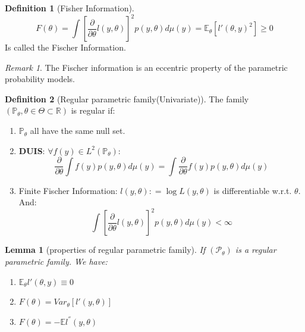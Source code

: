 \documentclass[a4paper,12pt, oneside, fleqn]{book}
\newtheorem{lemma}[theorem]{Lemma}
\theoremstyle{definition}
\newtheorem{definition}{Definition}[section]
\theoremstyle{remark}
\newtheorem*{remark}{Remark}
\begin{document}
\begin{definition}[Fisher Information]
\begin{equation*}
	F(\theta) = \int [\frac{\partial}{\partial \theta} l(y, \theta)]^2 p(y, \theta) d\mu(y) = \mathbb{E}_\theta [l'(\theta, y)^2] \geq 0
\end{equation*}
Is called the Fischer Information.
\end{definition}

\begin{remark}
	The Fischer information is an eccentric property of the parametric probability models. 
\end{remark}

\begin{definition}[Regular parametric family(Univariate)]
The family $(\mathbb{P}_\theta, \theta \in \Theta \subset \mathbb{R})$ is regular if:
\begin{enumerate}
	\item $\mathbb{P}_{\theta}$ all have the same null set.
	\item \textbf{DUIS}: $\forall f(y) \in L^2(\mathbb{P_\theta})$:
	\begin{equation} \label{RM}
		\frac{\partial}{\partial \theta} \int f(y) p(y, \theta) d\mu(y) = \int \frac{\partial}{\partial \theta} f(y) p(y, \theta) d\mu(y) 
	\end{equation}
	\item Finite Fischer Information: $l(y, \theta): = \log L(y,\theta)$ is differentiable w.r.t. $\theta$. And:
	\begin{equation*}
		\int [\frac{\partial}{\partial \theta} l(y, \theta)]^2 p(y, \theta) d\mu(y) < \infty
	\end{equation*}	
\end{enumerate}
\end{definition}

\begin{lemma}[properties of regular parametric family]
	If $(\mathcal{P}_\theta)$ is a regular parametric family. We have:
	\begin{enumerate}
		\item $\mathbb{E}_\theta l'(\theta, y) \equiv 0$
		\item $F(\theta) = Var_\theta[l'(y,\theta)]$
		\item $F(\theta) = -\mathbb{E}l^{''}(y, \theta)$
	\end{enumerate}
\end{lemma}
\end{document}
